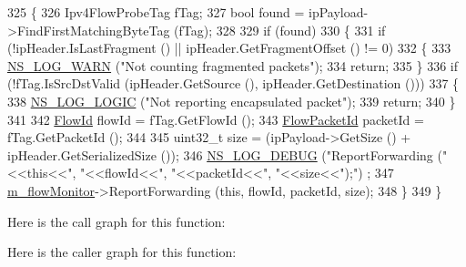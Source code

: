 \begin{DoxyCode}
325 \{
326   Ipv4FlowProbeTag fTag;
327   \textcolor{keywordtype}{bool} found = ipPayload->FindFirstMatchingByteTag (fTag);
328 
329   \textcolor{keywordflow}{if} (found)
330     \{
331       \textcolor{keywordflow}{if} (!ipHeader.IsLastFragment () || ipHeader.GetFragmentOffset () != 0)
332         \{
333           \hyperlink{group__logging_gade7208b4009cdf0e25783cd26766f559}{NS\_LOG\_WARN} (\textcolor{stringliteral}{"Not counting fragmented packets"});
334           \textcolor{keywordflow}{return};
335         \}
336       \textcolor{keywordflow}{if} (!fTag.IsSrcDstValid (ipHeader.GetSource (), ipHeader.GetDestination ()))
337         \{
338           \hyperlink{group__logging_ga88acd260151caf2db9c0fc84997f45ce}{NS\_LOG\_LOGIC} (\textcolor{stringliteral}{"Not reporting encapsulated packet"});
339           \textcolor{keywordflow}{return};
340         \}
341 
342       \hyperlink{group__flow-monitor_ga39a766c4a370cdb9ab8ac85da4b288e9}{FlowId} flowId = fTag.GetFlowId ();
343       \hyperlink{group__flow-monitor_gaa1cb18250e1672975204f1254b8aa2ae}{FlowPacketId} packetId = fTag.GetPacketId ();
344 
345       uint32\_t size = (ipPayload->GetSize () + ipHeader.GetSerializedSize ());
346       \hyperlink{group__logging_ga413f1886406d49f59a6a0a89b77b4d0a}{NS\_LOG\_DEBUG} (\textcolor{stringliteral}{"ReportForwarding ("}<<\textcolor{keyword}{this}<<\textcolor{stringliteral}{", "}<<flowId<<\textcolor{stringliteral}{", "}<<packetId<<\textcolor{stringliteral}{", "}<<size<<\textcolor{stringliteral}{");"})
      ;
347       \hyperlink{classns3_1_1FlowProbe_adab205c7ab7cf4c65d72d030d8aaa82a}{m\_flowMonitor}->ReportForwarding (\textcolor{keyword}{this}, flowId, packetId, size);
348     \}
349 \}
\end{DoxyCode}


Here is the call graph for this function\+:




Here is the caller graph for this function\+:


